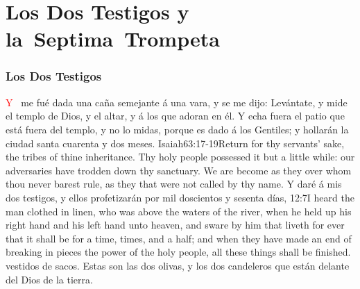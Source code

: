 
\chapter{Los Dos Testigos y \linebreak[0]\mbox{la Septima Trompeta}}
\subsection*{Los Dos Testigos}
\lettrine[lines=3,slope=-0.5em,loversize=0.1]{\textcolor{red}{Y}}{\ } me fué dada una caña semejante á una vara,%
 y se me dijo: Levántate, y mide el templo de Dios, y el altar, y á los que adoran en él. 
Y echa fuera el patio que está fuera del templo, y no lo midas, porque es dado á los Gentiles; y hollarán la ciudad santa cuarenta y dos meses.%
					{Isaiah}{63:17-19}{Return for thy servants’ sake, the tribes of thine inheritance. Thy holy people possessed it but a little while: our adversaries have trodden down thy sanctuary. We are become as they over whom thou never barest rule, as they that were not called by thy name.} %
Y daré á mis dos testigos, y ellos profetizarán por mil doscientos y sesenta días,%
					{12:7}{I heard the man clothed in linen, who was above the waters of the river, when he held up his right hand and his left hand unto heaven, and sware by him that liveth for ever that it shall be for a time, times, and a half; and when they have made an end of breaking in pieces the power of the holy people, all these things shall be finished.}
 vestidos de sacos. 
Estas son las dos olivas, y los dos candeleros que están delante del Dios de la tierra.%
